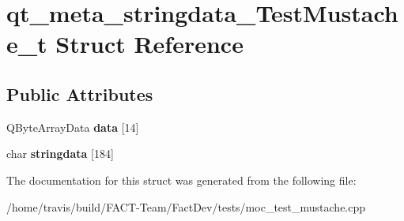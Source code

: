 \hypertarget{structqt__meta__stringdata__TestMustache__t}{\section{qt\-\_\-meta\-\_\-stringdata\-\_\-\-Test\-Mustache\-\_\-t Struct Reference}
\label{structqt__meta__stringdata__TestMustache__t}
}
\subsection*{Public Attributes}
\begin{DoxyCompactItemize}
\item 
\hypertarget{structqt__meta__stringdata__TestMustache__t_a1b2fa49931c7a21bd0f21afd07847a61}{Q\-Byte\-Array\-Data {\bfseries data} \mbox{[}14\mbox{]}}\label{structqt__meta__stringdata__TestMustache__t_a1b2fa49931c7a21bd0f21afd07847a61}

\item 
\hypertarget{structqt__meta__stringdata__TestMustache__t_ae7c059e5c1ca5c984729a4d5eea353c2}{char {\bfseries stringdata} \mbox{[}184\mbox{]}}\label{structqt__meta__stringdata__TestMustache__t_ae7c059e5c1ca5c984729a4d5eea353c2}

\end{DoxyCompactItemize}


The documentation for this struct was generated from the following file\-:\begin{DoxyCompactItemize}
\item 
/home/travis/build/\-F\-A\-C\-T-\/\-Team/\-Fact\-Dev/tests/moc\-\_\-test\-\_\-mustache.\-cpp\end{DoxyCompactItemize}

